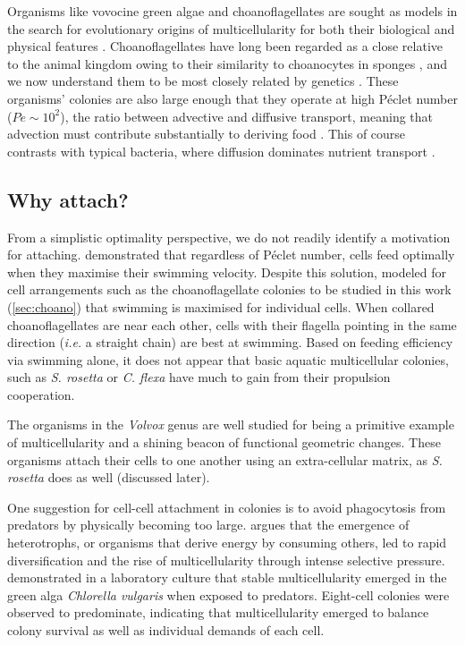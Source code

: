 Organisms like vovocine green algae and choanoflagellates are sought as models in the search for evolutionary origins of multicellularity for both their biological and physical features \citep{goldstein2015}. 
Choanoflagellates have long been regarded as a close relative to the animal kingdom owing to their similarity to choanocytes in sponges \citep{james1871}, and we now understand them to be most closely related by genetics \citep{lang2002,sebe2017}.
These organisms' colonies are also large enough that they operate at high P\'eclet number ($Pe \sim 10^2$), the ratio between advective and diffusive transport, meaning that advection must contribute substantially to deriving food \citep{solari2006}. 
This of course contrasts with typical bacteria, where diffusion dominates nutrient transport \citep{berg1977}.

\subsection{Why attach?} %


From a simplistic optimality perspective, we do not readily identify a motivation for attaching. 
\citet{michelin2011} demonstrated that regardless of P\'eclet number, cells feed optimally when they maximise their swimming velocity. 
Despite this solution, \citet{kirkegaard2016} modeled for cell arrangements such as the choanoflagellate colonies to be studied in this work (\cref{sec:choano}) that swimming is maximised for individual cells. 
When collared choanoflagellates are near each other, cells with their flagella pointing in the same direction (\textit{i.e.} a straight chain) are best at swimming.
Based on feeding efficiency via swimming alone, it does not appear that basic aquatic multicellular colonies, such as \textit{S. rosetta} or \textit{C. flexa} have much to gain from their propulsion cooperation.

The organisms in the \textit{Volvox} genus are well studied for being a primitive example of multicellularity and a shining beacon of functional geometric changes. 
These organisms attach their cells to one another using an extra-cellular matrix, as \textit{S. rosetta} does as well (discussed later). 

One suggestion for cell-cell attachment in colonies is to avoid phagocytosis from predators by physically becoming too large. 
\citet{stanley1973} argues that the emergence of heterotrophs, or organisms that derive energy by consuming others, led to rapid diversification and the rise of multicellularity through intense selective pressure. 
\citet{boraas1998} demonstrated in a laboratory culture that stable multicellularity emerged in the green alga \textit{Chlorella vulgaris} when exposed to predators.
Eight-cell colonies were observed to predominate, indicating that multicellularity emerged to balance colony survival as well as individual demands of each cell.

